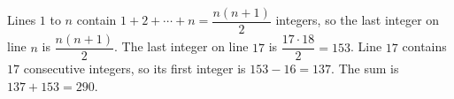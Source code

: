 Lines $1$ to $n$ contain $1+2+\cdots+n=\dfrac{n(n+1)}{2}$ integers, so the last integer on line $n$ is $\dfrac{n(n+1)}{2}$. The last integer on line $17$ is $\dfrac{17\cdot18}{2}=153$. Line $17$ contains $17$ consecutive integers, so its first integer is $153-16=137$. The sum is $137+153=\boxed{290}$.
